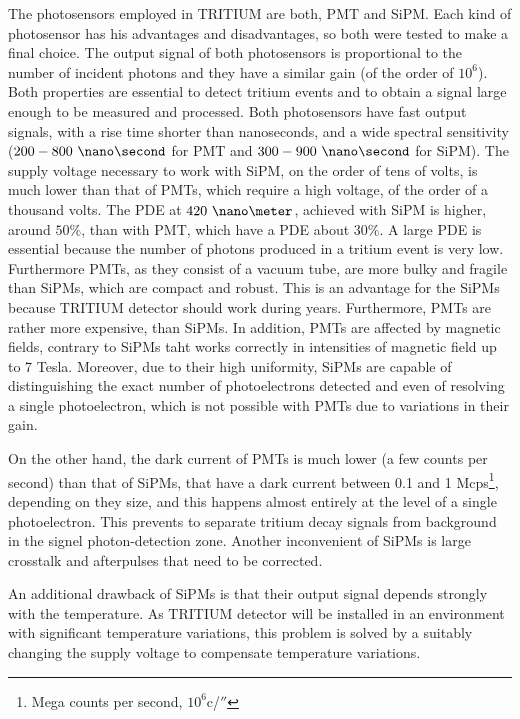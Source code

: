 The photosensors employed in TRITIUM are both, PMT and SiPM. Each kind of photosensor has his advantages and disadvantages, so both were tested to make a final choice. The output signal of both photosensors is proportional to the number of incident photons and they have a similar gain (of the order of $10^6$). Both properties are essential to detect tritium events and to obtain a signal large enough to be measured and processed. Both photosensors have fast output signals, with a rise time shorter than nanoseconds, and a wide spectral sensitivity ($200-800~\nano\second$ for PMT and $300-900~\nano\second$ for SiPM). The supply voltage necessary to work with SiPM, on the order of tens of volts, is much lower than that of PMTs, which require a high voltage, of the order of a thousand volts. The PDE at $420~\nano\meter$,  achieved with SiPM is higher, around $50\%$, than with PMT, which have a PDE about $30\%$. A large PDE is essential because the number of photons produced in a tritium event is very low. Furthermore PMTs, as they consist of a vacuum tube, are more bulky and fragile than SiPMs, which are compact and robust. This is an advantage for the SiPMs because TRITIUM detector should work during years. Furthermore, PMTs are rather more expensive, than SiPMs. In addition, PMTs are affected by magnetic fields, contrary to SiPMs taht works correctly in intensities  of magnetic field up to 7 Tesla. Moreover, due to their high uniformity, SiPMs are capable of distinguishing the exact number of photoelectrons detected and even of resolving a single photoelectron, which is not possible with PMTs due to variations in their gain.

On the other hand, the dark current of PMTs is much lower (a few counts per second) than that of SiPMs, that have a dark current between 0.1 and 1 Mcps\footnote{Mega counts per second, $10^6$c/$\second$}, depending on they size, and this happens almost entirely at the level of a single photoelectron. This prevents to separate tritium decay signals from background in the signel photon-detection zone. Another inconvenient of SiPMs is large crosstalk and afterpulses that need to be corrected.

An additional drawback of SiPMs is that their output signal depends strongly with the temperature. As TRITIUM detector will be installed in an environment with significant temperature variations, this problem is solved by a suitably changing the supply voltage to compensate temperature variations.